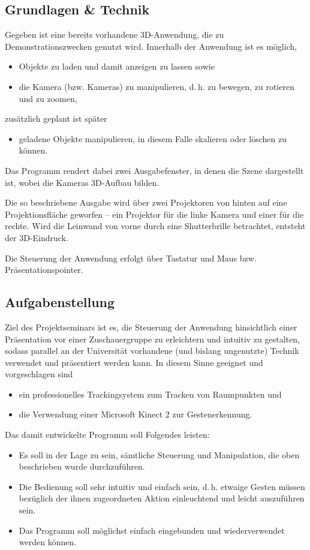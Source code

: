 \subsection{Grundlagen \& Technik}
	Gegeben ist eine bereits vorhandene 3D-Anwendung, die zu Demonstrationszwecken genutzt wird. Innerhalb der Anwendung ist es möglich,
	\begin{itemize}
		\item Objekte zu laden und damit anzeigen zu lassen sowie
		\item die Kamera (bzw. Kameras) zu manipulieren, d.\,h. zu bewegen, zu rotieren und zu zoomen,
	\end{itemize}
zusätzlich geplant ist später
	\begin{itemize}
		\item geladene Objekte manipulieren, in diesem Falle skalieren oder löschen zu können.
	\end{itemize}
	Das Programm rendert dabei zwei Ausgabefenster, in denen die Szene dargestellt ist, wobei die Kameras 3D-Aufbau bilden.\par
	Die so beschriebene Ausgabe wird über zwei Projektoren von hinten auf eine Projektionsfläche geworfen -- ein Projektor für die linke Kamera und einer für die rechte. Wird die \glqq Leinwand\grqq{} von vorne durch eine Shutterbrille betrachtet, entsteht der 3D-Eindruck.\par 
	Die Steuerung der Anwendung erfolgt über Tastatur und Maus bzw. Präsentationspointer.
	\subsection{Aufgabenstellung}
	Ziel des Projektseminars ist es, die Steuerung der Anwendung hinsichtlich einer Präsentation vor einer Zuschauergruppe zu erleichtern und intuitiv zu gestalten, sodass parallel an der Universität vorhandene (und bislang ungenutzte) Technik verwendet und präsentiert werden kann. In diesem Sinne geeignet und vorgeschlagen sind
	\begin{itemize}
		\item ein professionelles Trackingsystem zum Tracken von Raumpunkten und
		\item die Verwendung einer Microsoft Kinect 2 zur Gestenerkennung.
	\end{itemize}\par 
	Das damit entwickelte Programm soll Folgendes leisten:
	\begin{itemize}
		\item Es soll in der Lage zu sein, sämtliche Steuerung und Manipulation, die oben beschrieben wurde durchzuführen.
		\item Die Bedienung soll sehr intuitiv und einfach sein, d.\,h. etwaige Gesten müssen bezüglich der ihnen zugeordneten Aktion einleuchtend und leicht auszuführen sein.
		\item Das Programm soll möglichst einfach eingebunden und wiederverwendet werden können.		
	\end{itemize}